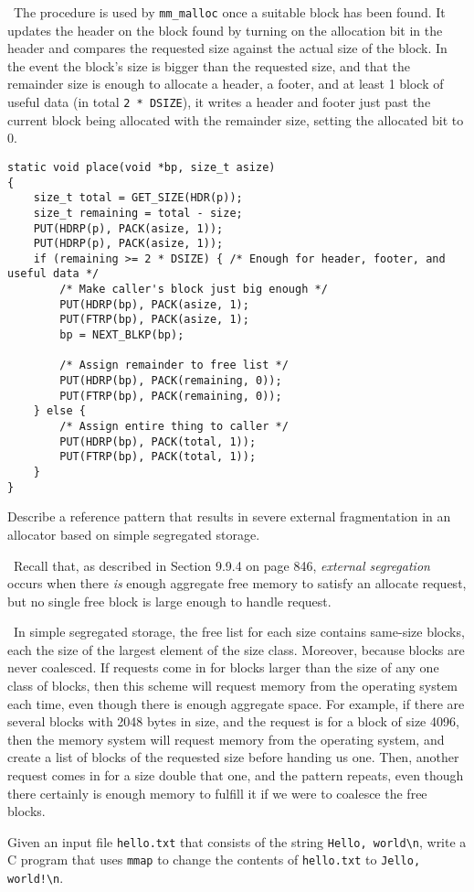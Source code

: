 \documentclass[12pt]{article}
\newenvironment{ex}[2][Exercise]{\begin{trivlist}
		\item[\hskip \labelsep {\bfseries #1}\hskip \labelsep {\bfseries #2.}]}{\end{trivlist}}
\newenvironment{sol}[1][Solution]{\begin{trivlist}
		\item[\hskip \labelsep {\bfseries #1:}]}{\end{trivlist}}
\begin{document}
\begin{sol}
	\
	The procedure is used by \texttt{mm\_malloc} once a suitable block has been found.
	It updates the header on the block found by turning on the allocation bit in the header and
	compares the requested size against the actual size of the block. In the event the block's	
	size is bigger than the requested size, and that the remainder size is enough to allocate a header,
	a footer, and at least 1 block of useful data (in total \texttt{2 * DSIZE}), it writes a
	header and footer just past the current block being allocated with the remainder size, setting
	the allocated bit to 0.
	\begin{lstlisting}
static void place(void *bp, size_t asize)
{
	size_t total = GET_SIZE(HDR(p));
	size_t remaining = total - size;
	PUT(HDRP(p), PACK(asize, 1));
	PUT(HDRP(p), PACK(asize, 1));
	if (remaining >= 2 * DSIZE) { /* Enough for header, footer, and useful data */
		/* Make caller's block just big enough */
		PUT(HDRP(bp), PACK(asize, 1);
		PUT(FTRP(bp), PACK(asize, 1);
		bp = NEXT_BLKP(bp);
		
		/* Assign remainder to free list */
		PUT(HDRP(bp), PACK(remaining, 0));
		PUT(FTRP(bp), PACK(remaining, 0));
	} else {
		/* Assign entire thing to caller */
		PUT(HDRP(bp), PACK(total, 1));
		PUT(FTRP(bp), PACK(total, 1));
	}
}
	\end{lstlisting}
\end{sol}

\begin{ex}{9.10}
	Describe a reference pattern that results in severe external fragmentation in an allocator
	based on simple segregated storage.
\end{ex}

\begin{sol}
	\
	Recall that, as described in Section 9.9.4 on page 846, \emph{external segregation} occurs
	when there \emph{is} enough aggregate free memory to satisfy an allocate request, but no
	single free block is large enough to handle request.
	
	\
	In simple segregated storage, the free list for each size contains same-size blocks, each the
	size of the largest element of the size class. Moreover, because blocks are never coalesced.
	If requests come in for blocks larger than the size of any one class of blocks, then this
	scheme will request memory from the operating system each time, even though there is enough
	aggregate space. For example, if there are several blocks with 2048 bytes in size, and
	the request is for a block of size 4096, then the memory system will request memory from
	the operating system, and create a list of blocks of the requested size before handing us one.
	Then, another request comes in for a size double that one, and the pattern repeats, even
	though there certainly is enough memory to fulfill it if we were to coalesce the free
	blocks.
\end{sol}

\begin{ex}{9.14}
	Given an input file \texttt{hello.txt} that consists of the string \texttt{Hello, world\textbackslash n}, write a C program that uses \texttt{mmap} to change the contents of
	\texttt{hello.txt} to \texttt{Jello, world!\textbackslash n}.
\end{ex}
\end{document}
